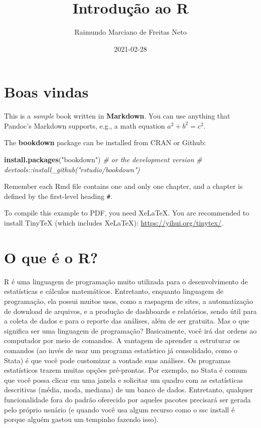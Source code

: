 \documentclass[
]{book}
\title{Introdução ao R}
\author{Raimundo Marciano de Freitas Neto}
\date{2021-02-28}
\newenvironment{Shaded}{\begin{snugshade}}{\end{snugshade}}
\newcommand{\CommentTok}[1]{\textcolor[rgb]{0.56,0.35,0.01}{\textit{#1}}}
\newcommand{\KeywordTok}[1]{\textcolor[rgb]{0.13,0.29,0.53}{\textbf{#1}}}
\newcommand{\NormalTok}[1]{#1}
\newcommand{\StringTok}[1]{\textcolor[rgb]{0.31,0.60,0.02}{#1}}
\begin{document}
\maketitle

{
\setcounter{tocdepth}{1}
\tableofcontents
}
\hypertarget{boas-vindas}{%
\chapter{Boas vindas}\label{boas-vindas}}

This is a \emph{sample} book written in \textbf{Markdown}. You can use anything that Pandoc's Markdown supports, e.g., a math equation \(a^2 + b^2 = c^2\).

The \textbf{bookdown} package can be installed from CRAN or Github:

\begin{Shaded}
\begin{Highlighting}[]
\KeywordTok{install.packages}\NormalTok{(}\StringTok{"bookdown"}\NormalTok{)}
\CommentTok{# or the development version}
\CommentTok{# devtools::install_github("rstudio/bookdown")}
\end{Highlighting}
\end{Shaded}

Remember each Rmd file contains one and only one chapter, and a chapter is defined by the first-level heading \texttt{\#}.

To compile this example to PDF, you need XeLaTeX. You are recommended to install TinyTeX (which includes XeLaTeX): \url{https://yihui.org/tinytex/}.

\hypertarget{intro}{%
\chapter{O que é o R?}\label{intro}}

R é uma linguagem de programação muito utilizada para o desenvolvimento de estatísticas e cálculos matemáticos. Entretanto, enquanto linguagem de programação, ela possui muitos usos, como a raspagem de sites, a automatização de download de arquivos, e a produção de dashboards e relatórios, sendo útil para a coleta de dados e para o reporte das análises, além de ser gratuita.
Mas o que significa ser uma linguagem de programação? Basicamente, você irá dar ordens ao computador por meio de comandos. A vantagem de aprender a estruturar os comandos (ao invés de usar um programa estatístico já consolidado, como o Stata) é que você pode customizar a vontade suas análises. Os programas estatísticos trazem muitas opções pré-prontas. Por exemplo, no Stata é comum que você possa clicar em uma janela e solicitar um quadro com as estatísticas descritivas (média, moda, mediana) de um banco de dados. Entretanto, qualquer funcionalidade fora do padrão oferecido por aqueles pacotes precisará ser gerada pelo próprio usuário (e quando você usa algum recurso como o ssc install é porque alguém gastou um tempinho fazendo isso).
\end{document}
